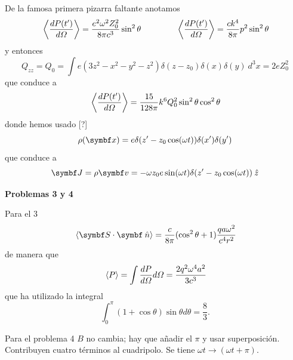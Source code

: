 \documentclass[10pt,oneside]{CBFT_book}
\begin{document}
De la famosa primera pizarra faltante anotamos
\[
	\:\left\langle  \frac{d^{\hspace{-0.05em}} {P(t')}}{d {\Omega}^{\hspace{-0.05em}}}  \right\rangle = \frac{e^2 \omega^2 Z_0^2 }{8 \pi c^3 } \sin^2\theta 
	\qquad \qquad 
	\:\left\langle  \frac{d^{\hspace{-0.05em}} {P(t')}}{d {\Omega}^{\hspace{-0.05em}}}  \right\rangle = \frac{c k^4 }{ 8 \pi } p^2 \sin^2\theta 
\]
y entonces
\[
	Q_{zz} = Q_0 = 
	\int e ( 3z^2 - x^2 - y^2 - z^2 ) \delta( z - z_0 ) \delta( x ) \delta( y ) \: d^3x = 
	2 e Z_0^2
\]
que conduce a
\[
	\:\left\langle  \frac{d^{\hspace{-0.05em}} {P(t')}}{d {\Omega}^{\hspace{-0.05em}}}  \right\rangle = \frac{15}{128\pi} k^6 Q_0^2 \sin^2\theta \cos^2\theta
\]
donde hemos usado [?]
\[
	\rho(\vbx) = e \delta(z'-z_0\cos(\omega t)) \delta(x') \delta(y')
\]
que conduce a
\[
	\vb{J} = \rho \vb{v} = - \omega z_0 e \sin(\omega t) \delta(z'-z_0\cos(\omega t)) \zver
\]




\begin{ejemplo}{\bf Problemas 3 y 4}

Para el 3
\[
	\vm{\pe{S}{\nver}} = \frac{c}{8\pi}(\cos^2\theta+1)\frac{q a \omega^2}{c^4r^2}
\]
de manera que
\[
	\:\left\langle P \right\rangle = \int \frac{d^{\hspace{-0.05em}} {P}}{d {\Omega}^{\hspace{-0.05em}}} d\Omega = \frac{2q^2\omega^4a^2}{3c^3}
\]
que ha utilizado la integral
\[
	\int_0^\pi (1+\cos\theta) \sin\theta d\theta = \frac{8}{3}.
\]

Para el problema 4 $B$ no cambia; hay que añadir el $\pi$ y usar superposición.
Contribuyen cuatro términos al cuadripolo. Se tiene $\omega t \to (\omega t + \pi )$.
 
\end{ejemplo}
\end{document}
